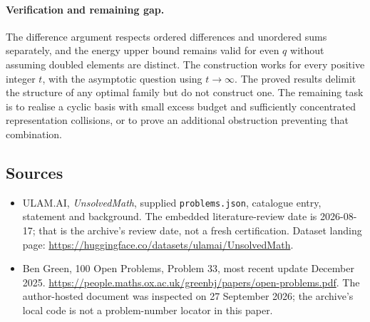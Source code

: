 \documentclass[11pt,a4paper]{article}
\begin{document}
\paragraph{Verification and remaining gap.}
The difference argument respects ordered differences and unordered sums separately, and the energy upper bound remains valid for even $q$ without assuming doubled elements are distinct. The construction works for every positive integer $t$, with the asymptotic question using $t\to\infty$. The proved results delimit the structure of any optimal family but do not construct one. The remaining task is to realise a cyclic basis with small excess budget and sufficiently concentrated representation collisions, or to prove an additional obstruction preventing that combination.

\subsection{Sources}

{\small

\begin{itemize}

\item[\hypertarget{source:statement:1}{S1}] ULAM.AI, \emph{UnsolvedMath}, supplied \texttt{problems.json}, catalogue entry, statement and background. The embedded literature-review date is 2026-08-17; that is the archive’s review date, not a fresh certification. Dataset landing page: \url{https://huggingface.co/datasets/ulamai/UnsolvedMath}.

\item[\hypertarget{source:statement:2}{S2}] Ben Green, 100 Open Problems, Problem 33, most recent update December 2025. \url{https://people.maths.ox.ac.uk/greenbj/papers/open-problems.pdf}. The author-hosted document was inspected on 27 September 2026; the archive’s local code is not a problem-number locator in this paper.

\end{itemize}

}

\label{end:statement}
\end{document}
